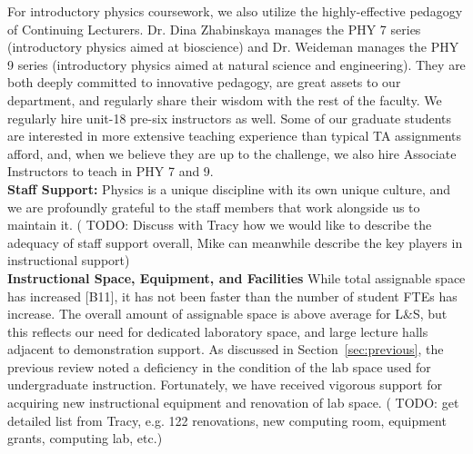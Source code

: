 \documentclass[12pt]{article}
\begin{document}
For introductory physics coursework, we also utilize the
highly-effective pedagogy of Continuing Lecturers.  Dr. Dina
Zhabinskaya manages the PHY 7 series (introductory physics aimed at
bioscience) and Dr. Weideman manages the PHY 9 series (introductory
physics aimed at natural science and engineering).  They are both
deeply committed to innovative pedagogy, are great assets to our
department, and regularly share their wisdom with the rest of the
faculty.  We regularly hire unit-18 pre-six instructors as well.  Some
of our graduate students are interested in more extensive teaching
experience than typical TA assignments afford, and, when we believe
they are up to the challenge, we also hire Associate Instructors to
teach in PHY 7 and 9.\\[3pt]

\noindent
{\bf Staff Support:}
Physics is a unique discipline with its own unique culture, and we are profoundly grateful to the staff members that work alongside us to maintain it.
({\color{red} TODO:  Discuss with Tracy how we would like to describe the adequacy of staff support overall, Mike can meanwhile describe the key players in instructional support})\\[3pt]


\noindent
{\bf Instructional Space, Equipment, and Facilities} While total
assignable space has increased [B11], it has not been faster than the
number of student FTEs has increase.  The overall amount of assignable
space is above average for L\&S, but this reflects our need for
dedicated laboratory space, and large lecture halls adjacent to
demonstration support.  As discussed in Section~\ref{sec:previous},
the previous review noted a deficiency in the condition of the lab
space used for undergraduate instruction.  Fortunately, we have
received vigorous support for acquiring new instructional equipment
and renovation of lab space.  ({\color{red} TODO: get detailed list
  from Tracy, e.g. 122 renovations, new computing room, equipment
  grants, computing lab, etc}.)\\[3pt]
\end{document}
